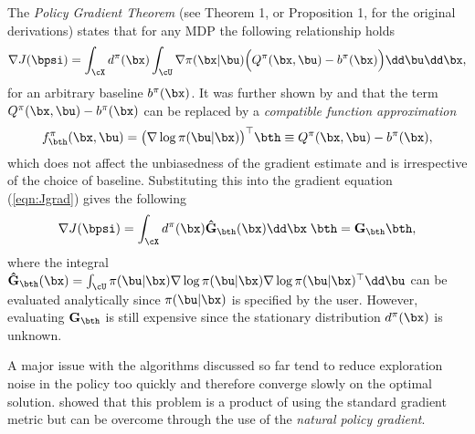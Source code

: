 The \textit{Policy Gradient Theorem} (see Theorem 1, \cite{MT01} or Proposition 1, \cite{SMSM00} for the original derivations) states that for any MDP the following relationship holds 
\begin{equation}
\nabla  J(\bpsi) = \int_{\cX} d^\pi(\bx) \int_{\cU} \nabla  \pi(\bx|\bu) \Big( Q^\pi(\bx,\bu) - b^\pi(\bx) \Big) \dd\bu\dd\bx, \label{eqn:Jgrad}
\end{equation}
for an arbitrary baseline $b^\pi(\bx)$. It was further shown by \cite{MT01} and \cite{SMSM00} that the term $Q^\pi(\bx,\bu) - b^\pi(\bx)$ can be replaced by a \textit{compatible function approximation}
\begin{equation}
f^\pi_{\bth}(\bx,\bu) = \big(\nabla  \log \pi(\bu|\bx)\big)^\top \bth \equiv Q^\pi(\bx,\bu) - b^\pi(\bx),
\end{equation}
which does not affect the unbiasedness of the gradient estimate and is irrespective of the choice of baseline. Substituting this into the gradient equation (\ref{eqn:Jgrad}) gives the following
\begin{equation}
\nabla  J(\bpsi) = \int_{\cX} d^\pi(\bx) \mathbf{\hat G}_{\bth}(\bx) \dd\bx \; \bth = \mathbf{G}_{\bth} \bth,
\end{equation}
where the integral $\mathbf{\hat G}_{\bth}(\bx) = \int_{\cU} \pi(\bu|\bx)\nabla \log\pi(\bu|\bx)\nabla \log\pi(\bu|\bx)^\top \dd\bu$ can be evaluated analytically since $\pi(\bu|\bx)$ is specified by the user. However, evaluating $\mathbf{G}_{\bth}$ is still expensive since the stationary distribution $d^\pi(\bx)$ is unknown.

A major issue with the algorithms discussed so far tend to reduce exploration noise in the policy too quickly and therefore converge slowly on the optimal solution. \cite{Kak02} showed that this problem is a product of using the standard gradient metric but can be overcome through the use of the \textit{natural policy gradient}.


